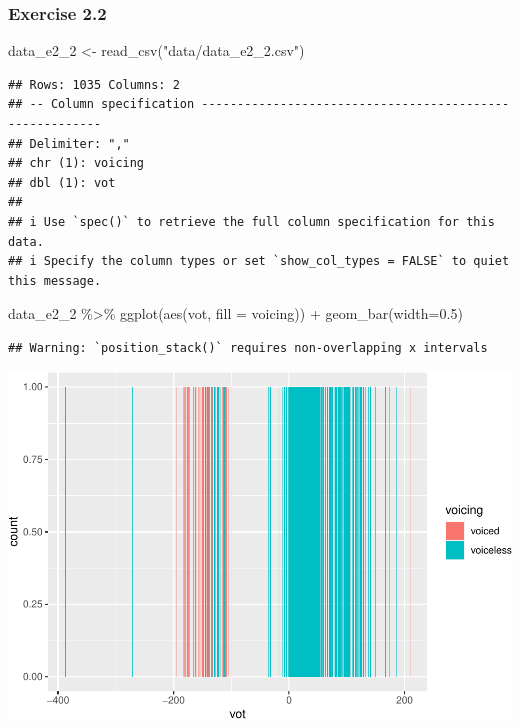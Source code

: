 \documentclass[
]{article}
\newenvironment{Shaded}{\begin{snugshade}}{\end{snugshade}}
\newcommand{\AttributeTok}[1]{\textcolor[rgb]{0.77,0.63,0.00}{#1}}
\newcommand{\FloatTok}[1]{\textcolor[rgb]{0.00,0.00,0.81}{#1}}
\newcommand{\FunctionTok}[1]{\textcolor[rgb]{0.00,0.00,0.00}{#1}}
\newcommand{\NormalTok}[1]{#1}
\newcommand{\OtherTok}[1]{\textcolor[rgb]{0.56,0.35,0.01}{#1}}
\newcommand{\SpecialCharTok}[1]{\textcolor[rgb]{0.00,0.00,0.00}{#1}}
\newcommand{\StringTok}[1]{\textcolor[rgb]{0.31,0.60,0.02}{#1}}
\begin{document}
\hypertarget{exercise-2.2}{%
\subsubsection{Exercise 2.2}\label{exercise-2.2}}

\begin{Shaded}
\begin{Highlighting}[]
\NormalTok{data\_e2\_2 }\OtherTok{\textless{}{-}} \FunctionTok{read\_csv}\NormalTok{(}\StringTok{"data/data\_e2\_2.csv"}\NormalTok{)}
\end{Highlighting}
\end{Shaded}

\begin{verbatim}
## Rows: 1035 Columns: 2
## -- Column specification --------------------------------------------------------
## Delimiter: ","
## chr (1): voicing
## dbl (1): vot
## 
## i Use `spec()` to retrieve the full column specification for this data.
## i Specify the column types or set `show_col_types = FALSE` to quiet this message.
\end{verbatim}

\begin{Shaded}
\begin{Highlighting}[]
\NormalTok{data\_e2\_2 }\SpecialCharTok{\%\textgreater{}\%}
  \FunctionTok{ggplot}\NormalTok{(}\FunctionTok{aes}\NormalTok{(vot, }\AttributeTok{fill =}\NormalTok{ voicing)) }\SpecialCharTok{+}
  \FunctionTok{geom\_bar}\NormalTok{(}\AttributeTok{width=}\FloatTok{0.5}\NormalTok{)}
\end{Highlighting}
\end{Shaded}

\begin{verbatim}
## Warning: `position_stack()` requires non-overlapping x intervals
\end{verbatim}

\includegraphics{analysis_files/figure-latex/e2-2-1.pdf}
\end{document}
